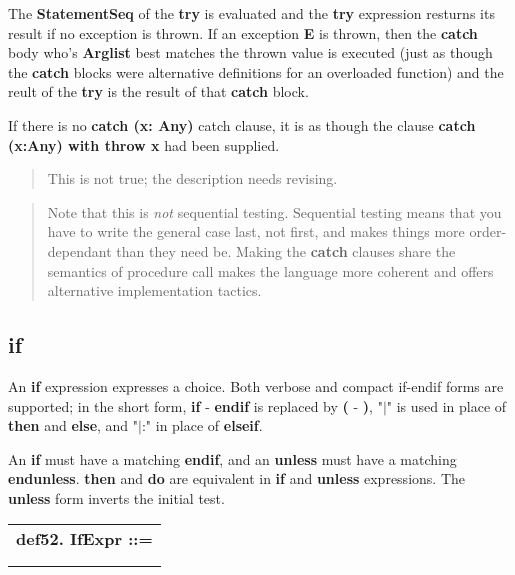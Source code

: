 \documentclass{report}
\begin{document}
The {\bf StatementSeq} of the {\bf try} is evaluated and the {\bf try} expression resturns
its result if no exception is thrown. If an exception {\bf E} is thrown, then
the {\bf catch} body who's {\bf Arglist} best matches the thrown value is executed
(just as though the {\bf catch} blocks were alternative definitions for an
overloaded function) and the reult of the {\bf try} is the result of that
{\bf catch} block.

If there is no {\bf catch (x: Any)} catch clause, it is as though the clause
{\bf catch (x:Any) with throw x} had been supplied.

\begin{quote}This is not true; the description needs revising.\end{quote}

\begin{quote}Note that this is {\em not} sequential testing. Sequential testing means that you
have to write the general case last, not first, and makes things more
order-dependant than they need be. Making the {\bf catch} clauses share the
semantics of procedure call makes the language more coherent and offers
alternative implementation tactics.\end{quote}

\subsection{if}


An {\bf if} expression expresses a choice. Both verbose and compact if-endif forms
are supported; in the short form, {\bf if} - {\bf endif} is replaced by {\bf (} - {\bf )},
"$\mid$" is used in place of {\bf then} and {\bf else}, and "$\mid$:" in place of {\bf elseif}.

An {\bf if} must have a matching {\bf endif}, and an {\bf unless} must have a matching
{\bf endunless}. {\bf then} and {\bf do} are equivalent in {\bf if} and {\bf unless} expressions.
The {\bf unless} form inverts the initial test.

\begin{tabular}{l}
{\bf def52. IfExpr ::= }\\ 
\hspace*{3mm}{\tt LongIfExpr} \\ 
\hspace*{3mm}{\tt  $\mid$ ShortIfExpr} \\ 
\end{tabular}
\end{document}
